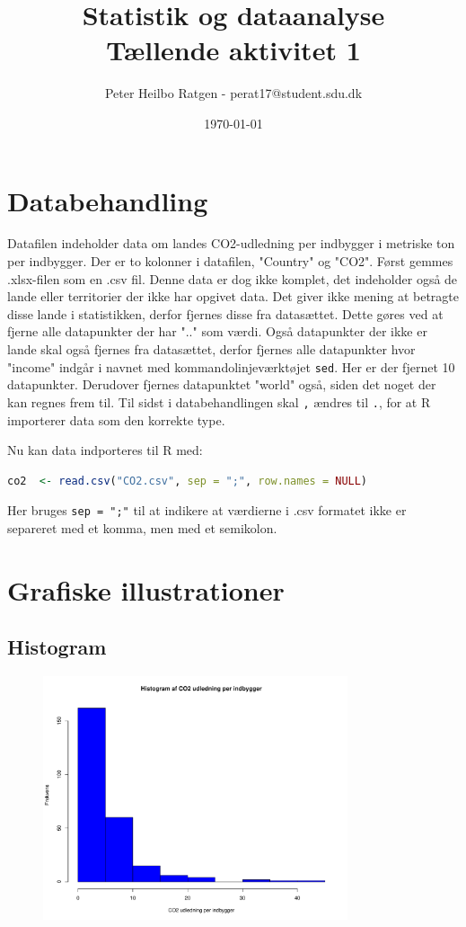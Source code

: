 \documentclass{article}
\title{Statistik og dataanalyse \\ Tællende aktivitet 1}
\author{Peter Heilbo Ratgen - perat17@student.sdu.dk}
\date{\today}
\begin{document}
\maketitle
\newpage
\section{Databehandling}
Datafilen indeholder data om landes CO2-udledning per indbygger i metriske ton
per indbygger. Der er to kolonner i datafilen, "Country" og "CO2". Først gemmes
.xlsx-filen som en .csv fil. Denne data er dog ikke komplet, det indeholder også de
lande eller territorier der ikke har opgivet data. Det giver ikke mening at
betragte disse lande i statistikken, derfor fjernes disse fra datasættet. Dette
gøres ved at fjerne alle datapunkter der har ".." som værdi.
Også datapunkter der ikke er lande skal også fjernes fra datasættet, derfor fjernes
alle datapunkter hvor "income" indgår i navnet med kommandolinjeværktøjet
\texttt{sed}. Her er der fjernet 10 datapunkter. Derudover fjernes datapunktet
"world" også, siden det noget der kan regnes frem til. Til sidst i
databehandlingen skal \lstinline|,| ændres til \lstinline|.|, for at R
importerer data som den korrekte type.

Nu kan data indporteres til R med:
\begin{lstlisting}[language=R]
co2  <- read.csv("CO2.csv", sep = ";", row.names = NULL)
\end{lstlisting}
Her bruges \lstinline|sep = ";"| til at indikere at værdierne i .csv formatet
ikke er separeret med et komma, men med et semikolon.

\section{Grafiske illustrationer}

\subsection{Histogram}

\begin{figure}[H]
  \centering
  \includegraphics[width=0.8\textwidth]{co2plot.pdf}
\end{figure}
\end{document}
